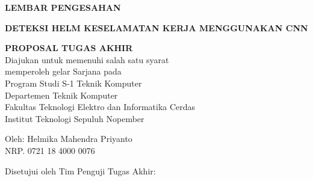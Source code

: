 \begin{center}
	\large
  \textbf{LEMBAR PENGESAHAN}
\end{center}

\thispagestyle{empty}

\begin{center}
  \textbf{DETEKSI HELM KESELAMATAN KERJA MENGGUNAKAN CNN}
\end{center}

\begingroup
  \small
  

  \begin{center}
    \textbf{PROPOSAL TUGAS AKHIR}
    \\Diajukan untuk memenuhi salah satu syarat
    \\memperoleh gelar Sarjana pada
    \\Program Studi S-1 Teknik Komputer
    \\Departemen Teknik Komputer
    \\Fakultas Teknologi Elektro dan Informatika Cerdas
    \\Institut Teknologi Sepuluh Nopember
  \end{center}


  \begin{center}
    Oleh: Helmika Mahendra Priyanto
    \\NRP. 0721 18 4000 0076
  \end{center}



  \begin{center}
    Disetujui oleh Tim Penguji Tugas Akhir:
  \end{center}

  \vspace{4ex}

  \begingroup
    \setlength{\tabcolsep}{0pt}

